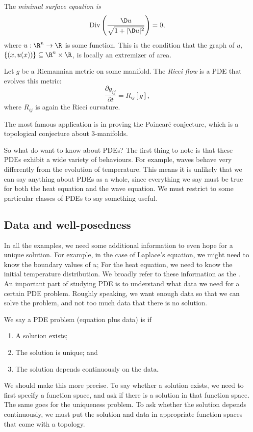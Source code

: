 \documentclass[a4paper]{article}
\begin{document}
\begin{eg}
  The \emph{minimal surface equation is}
  \[
    \mathrm{Div}\left(\frac{\D u}{\sqrt{1 + |\D u|^2}}\right) = 0,
  \]
  where $u: \R^n \to \R$ is some function. This is the condition that the graph of $u$, $\{(x, u(x))\}\subseteq \R^n \times \R$, is locally an extremizer of area.
\end{eg}

\begin{eg}
  Let $g$ be a Riemannian metric on some manifold. The \emph{Ricci flow} is a PDE that evolves this metric:
  \[
    \frac{\partial g_{ij}}{\partial t} = R_{ij}[g],
  \]
  where $R_{ij}$ is again the Ricci curvature.

  The most famous application is in proving the Poincar\'e conjecture, which is a topological conjecture about $3$-manifolds.
\end{eg}

So what do want to know about PDEs? The first thing to note is that these PDEs exhibit a wide variety of behaviours. For example, waves behave very differently from the evolution of temperature. This means it is unlikely that we can say anything about PDEs as a whole, since everything we say must be true for both the heat equation and the wave equation. We must restrict to some particular classes of PDEs to say something useful.

\subsection{Data and well-posedness}
In all the examples, we need some additional information to even hope for a unique solution. For example, in the case of Laplace's equation, we might need to know the boundary values of $u$; For the heat equation, we need to know the initial temperature distribution. We broadly refer to these information as the . An important part of studying PDE is to understand what data we need for a certain PDE problem. Roughly speaking, we want enough data so that we can solve the problem, and not too much data that there is no solution.

\begin{defi}
  We say a PDE problem (equation plus data) is  if
  \begin{enumerate}
    \item A solution exists;
    \item The solution is unique; and
    \item The solution depends continuously on the data.
  \end{enumerate}
\end{defi}
We should make this more precise. To say whether a solution exists, we need to first specify a function space, and ask if there is a solution in that function space. The same goes for the uniqueness problem. To ask whether the solution depends continuously, we must put the solution and data in appropriate function spaces that come with a topology.
\end{document}
